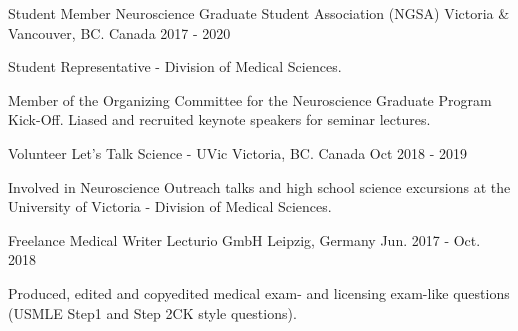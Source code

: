 \begin{cventries}
  \cventry
    {Student Member} %
    {Neuroscience Graduate Student Association (NGSA)} %
    {Victoria \& Vancouver, BC. Canada} %
    {2017 - 2020} %
    {
      \begin{cvitems} %
        \item {Student Representative - Division of Medical Sciences.}
        \item {Member of the Organizing Committee for the Neuroscience Graduate Program Kick-Off. Liased and recruited keynote speakers for seminar lectures.}
      \end{cvitems}
    }
    \cventry
    {Volunteer} %
    {Let's Talk Science - UVic} %
    {Victoria, BC. Canada} %
    {Oct 2018 - 2019} %
    {
    \begin{cvitems} %
    \item {Involved in Neuroscience Outreach talks and high school science excursions at the University of Victoria - Division of Medical Sciences.}
    \end{cvitems}
    }
\vspace{10pt}
    \cventry
    {Freelance Medical Writer} %
    {Lecturio GmbH} %
    {Leipzig, Germany} %
    {Jun. 2017 - Oct. 2018} %
    {
    \begin{cvitems} %
      \item {Produced, edited and copyedited medical exam- and licensing exam-like questions (USMLE Step1 and Step 2CK style questions).}
    \end{cvitems}
    } 
\vspace{5pt} 


\end{cventries}
